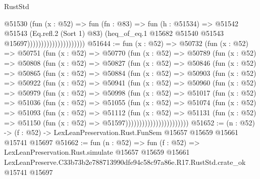 \begin{lexlean}{RustStd}
\begin{coremodule}
                                        @51530
                                          (fun (x : @52) =>
                                          fun (fn : @83) =>
                                          fun (h : @51534) =>
                                          @51542
                                            @51543
                                            (Eq.refl.{2} (Sort 1) @83)
                                            (heq_of_eq.{1}
                                              @15682
                                              @51540
                                              @51543
                                              @15697)))))))))))))))))))))
@51644 := fun (x : @52) =>
  @50732
    (fun (x : @52) =>
    @50751
      (fun (x : @52) =>
      @50770
        (fun (x : @52) =>
        @50789
          (fun (x : @52) =>
          @50808
            (fun (x : @52) =>
            @50827
              (fun (x : @52) =>
              @50846
                (fun (x : @52) =>
                @50865
                  (fun (x : @52) =>
                  @50884
                    (fun (x : @52) =>
                    @50903
                      (fun (x : @52) =>
                      @50922
                        (fun (x : @52) =>
                        @50941
                          (fun (x : @52) =>
                          @50960
                            (fun (x : @52) =>
                            @50979
                              (fun (x : @52) =>
                              @50998
                                (fun (x : @52) =>
                                @51017
                                  (fun (x : @52) =>
                                  @51036
                                    (fun (x : @52) =>
                                    @51055
                                      (fun (x : @52) =>
                                      @51074
                                        (fun (x : @52) =>
                                        @51093
                                          (fun (x : @52) =>
                                          @51112
                                            (fun (x : @52) =>
                                            @51131
                                              (fun (x : @52) =>
                                              @51150 (fun (x : @52) => @51597)))))))))))))))))))))))
@51652 := (n : @52) ->
  (f : @52) -> LexLeanPreservation.Rust.FunSem @15657 @15659 @15661 @15741 @15697
@51662 := fun (n : @52) =>
  fun (f : @52) =>
  LexLeanPreservation.Rust.simulate
    @15657
    @15659
    @15661
    LexLeanPreserve.C33b73b2e788713990dfe94c58c97a86e.R17.RustStd.crate_ok
    @15741
    @15697
\end{coremodule}
\end{lexlean}
